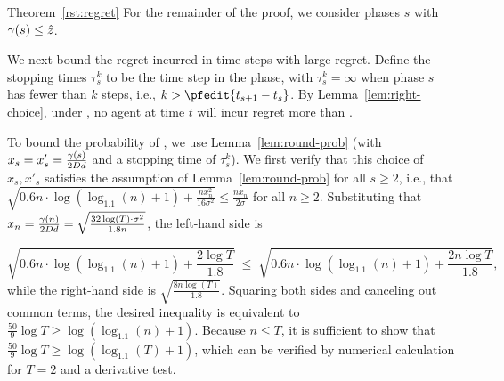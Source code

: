 \begin{emptyextraproof}{Theorem~\ref{rst:regret}}
For the remainder of the proof, we consider phases $s$
with $\EarlyCut{s} \leq \TieCutoff$.

We next bound the regret incurred in time steps with large regret.
Define the stopping times $\tau_{s}^{k}$ to be the 
time step in the  phase,
with $\tau_{s}^{k} = \infty$ when phase $s$ has fewer than $k$ steps,
i.e., $k > \pfedit{t_{s+1}-t_{s}}$.
By Lemma~\ref{lem:right-choice},
under , no agent at time $t$ will incur
regret more than .
  
To bound the probability of ,
we use Lemma~\ref{lem:round-prob}
(with $x_s = x'_s = \frac{\EarlyCut{s}}{2 \Diam d}$
and a stopping time of $\tau_s^k$).
We first verify that this choice of $x_s, x'_s$
satisfies the assumption of Lemma~\ref{lem:round-prob} for all
$s \geq 2$,
i.e., that
$\sqrt{0.6 n \cdot \log (\log_{1.1}(n) + 1) + \frac{n x_n^2}{16 \sigma^2}}
\leq \frac{n x_n}{2 \sigma}$
for all $n \geq 2$.
Substituting that
$x_n = \frac{\EarlyCut{n}}{2 \Diam d} = \sqrt{\frac{32\log(T) \cdot \sigma^2}{1.8 n}}$,
the left-hand side is

\[
  \sqrt{0.6 n \cdot \log (\log_{1.1}(n) + 1) + \frac{2 \log T}{1.8}}
  \; \leq \;
  \sqrt{0.6 n \cdot \log (\log_{1.1}(n) + 1) + \frac{2 n \log T}{1.8}},
\]
while the right-hand side is $\sqrt{\frac{8 n \log(T)}{1.8}}$.
Squaring both sides and canceling out common terms,
the desired inequality is equivalent to
$\frac{50}{9} \log T \geq \log(\log_{1.1}(n) + 1)$.
Because $n \leq T$, it is sufficient to show that
$\frac{50}{9} \log T \geq \log(\log_{1.1}(T) + 1)$,
which can be verified by numerical calculation for $T=2$ and a
derivative test.


\end{emptyextraproof}
